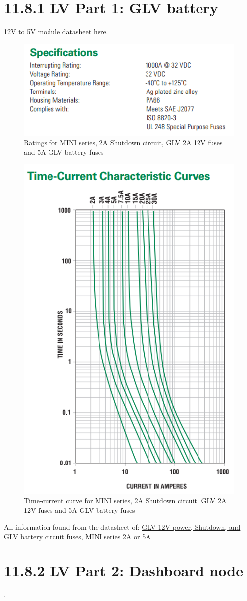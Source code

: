 \documentclass{article}
\begin{document}
\section*{11.8.1 LV Part 1: GLV battery}

\href{https://www.superbrightleds.com/moreinfo/bar-strip-accessories/12vdc-to-5vdc-voltage-converter-/1549/3652/#/tab/Specifications}{12V to 5V module datasheet here}.

\begin{figure}[H]
    \centering
    \includegraphics[width = 0.4 \textwidth]{shutdownfuseratings}
    \caption{Ratings for MINI series, 2A Shutdown circuit, GLV 2A 12V fuses and 5A GLV battery fuses}
    \label{shutdownfuseratings}
\end{figure}

\begin{figure}[H]
    \centering
    \includegraphics[width = 0.4 \textwidth]{shutdownfusecurve}
    \caption{Time-current curve for MINI series, 2A Shutdown circuit, GLV 2A 12V fuses and 5A GLV battery fuses}
    \label{shutdownfusecurve}
\end{figure}

All information found from the datasheet of:
\href{http://www.littelfuse.com/~/media/automotive/datasheets/fuses/automotive-fuses/littelfuse_automotive_blade_fuse_mini_32v.pdf}{GLV 12V power, Shutdown, and GLV battery circuit fuses, MINI series 2A or 5A}

\section*{11.8.2 LV Part 2: Dashboard node}.
\end{document}

